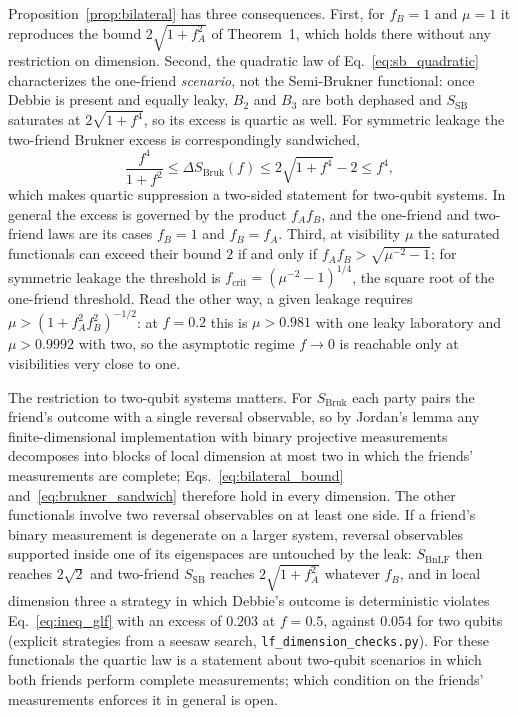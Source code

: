 Proposition~\ref{prop:bilateral} has three consequences. First, for $f_B = 1$ and $\mu = 1$ it reproduces the bound $2\sqrt{1 + f_A^2}$ of Theorem~1, which holds there without any restriction on dimension. Second, the quadratic law of Eq.~\eqref{eq:sb_quadratic} characterizes the one-friend \emph{scenario}, not the Semi-Brukner functional: once Debbie is present and equally leaky, $B_2$ and $B_3$ are both dephased and $S_{\mathrm{SB}}$ saturates at $2\sqrt{1 + f^4}$, so its excess is quartic as well. For symmetric leakage the two-friend Brukner excess is correspondingly sandwiched,
\begin{equation}
    \frac{f^4}{1 + f^2} \le \Delta S_{\mathrm{Bruk}}(f) \le 2\sqrt{1 + f^4} - 2 \le f^4,
    \label{eq:brukner_sandwich}
\end{equation}
which makes quartic suppression a two-sided statement for two-qubit systems. In general the excess is governed by the product $f_A f_B$, and the one-friend and two-friend laws are its cases $f_B = 1$ and $f_B = f_A$. Third, at visibility $\mu$ the saturated functionals can exceed their bound $2$ if and only if $f_A f_B > \sqrt{\mu^{-2} - 1}$; for symmetric leakage the threshold is $f_{\mathrm{crit}} = (\mu^{-2} - 1)^{1/4}$, the square root of the one-friend threshold. Read the other way, a given leakage requires $\mu > (1 + f_A^2 f_B^2)^{-1/2}$: at $f = 0.2$ this is $\mu > 0.981$ with one leaky laboratory and $\mu > 0.9992$ with two, so the asymptotic regime $f \to 0$ is reachable only at visibilities very close to one.

The restriction to two-qubit systems matters. For $S_{\mathrm{Bruk}}$ each party pairs the friend's outcome with a single reversal observable, so by Jordan's lemma any finite-dimensional implementation with binary projective measurements decomposes into blocks of local dimension at most two in which the friends' measurements are complete; Eqs.~\eqref{eq:bilateral_bound} and~\eqref{eq:brukner_sandwich} therefore hold in every dimension. The other functionals involve two reversal observables on at least one side. If a friend's binary measurement is degenerate on a larger system, reversal observables supported inside one of its eigenspaces are untouched by the leak: $S_{\mathrm{BnLF}}$ then reaches $2\sqrt{2}$ and two-friend $S_{\mathrm{SB}}$ reaches $2\sqrt{1 + f_A^2}$ whatever $f_B$, and in local dimension three a strategy in which Debbie's outcome is deterministic violates Eq.~\eqref{eq:ineq_glf} with an excess of $0.203$ at $f = 0.5$, against $0.054$ for two qubits (explicit strategies from a seesaw search, \texttt{lf\_dimension\_checks.py}). For these functionals the quartic law is a statement about two-qubit scenarios in which both friends perform complete measurements; which condition on the friends' measurements enforces it in general is open.

